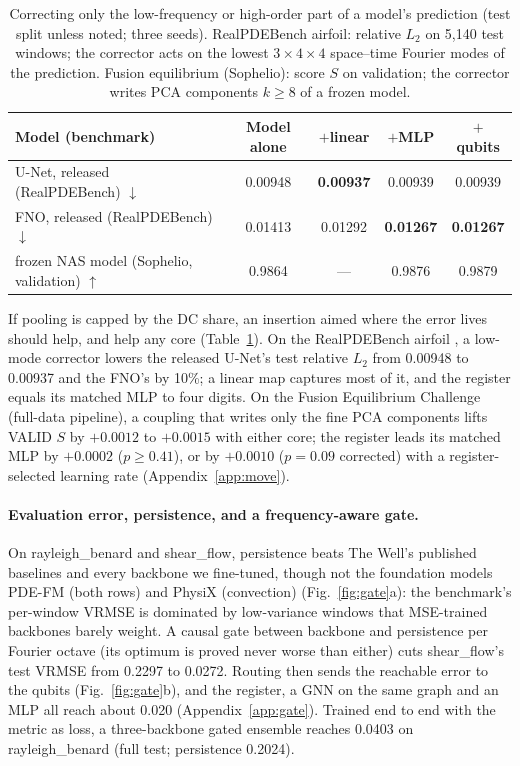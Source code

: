 \documentclass{article}
\begin{document}
\begin{table}[t]
\centering
\caption{Correcting only the low-frequency or high-order part of a model's prediction (test split unless noted;
three seeds). RealPDEBench airfoil: relative $L_2$ on 5{,}140 test windows; the corrector acts on the
lowest $3{\times}4{\times}4$ space--time Fourier modes of the prediction. Fusion equilibrium (Sophelio):
score $S$ on validation; the corrector writes PCA components $k\ge8$ of a frozen model.}
\label{tab:move}
\small
\setlength{\tabcolsep}{4pt}
\begin{tabular}{lcccc}
\toprule
Model (benchmark) & Model alone & $+$linear & $+$MLP & $+$qubits \\
\midrule
U-Net, released (RealPDEBench) $\downarrow$ & 0.00948 & \textbf{0.00937} & 0.00939 & 0.00939 \\
FNO, released (RealPDEBench) $\downarrow$ & 0.01413 & 0.01292 & \textbf{0.01267} & \textbf{0.01267} \\
frozen NAS model (Sophelio, validation) $\uparrow$ & 0.9864 & --- & 0.9876 & 0.9879 \\
\bottomrule
\end{tabular}
\end{table}

If pooling is capped by the DC share, an insertion aimed where the error lives should help, and help any core
(Table~\ref{tab:move}). On the RealPDEBench airfoil \citep{hu2026realpdebench}, a low-mode corrector lowers the
released U-Net's test relative $L_2$ from 0.00948 to 0.00937 and the FNO's by 10\%; a linear map captures most of it,
and the register equals its matched MLP to four digits. On the Fusion Equilibrium Challenge (full-data pipeline), a
coupling that writes only the fine PCA components lifts VALID $S$ by $+0.0012$ to $+0.0015$ with either core; the
register leads its matched MLP by $+0.0002$ ($p \ge 0.41$), or by $+0.0010$ ($p=0.09$ corrected) with a
register-selected learning rate (Appendix~\ref{app:move}).

\paragraph{Evaluation error, persistence, and a frequency-aware gate.} On rayleigh\_benard and shear\_flow, persistence
beats The Well's published baselines and every backbone we fine-tuned, though not the foundation models PDE-FM (both rows) and PhysiX (convection) (Fig.~\ref{fig:gate}a): the benchmark's per-window VRMSE is dominated by
low-variance windows that MSE-trained backbones barely weight. A causal gate between backbone and persistence per Fourier
octave (its optimum is proved never worse than either) cuts shear\_flow's test VRMSE from 0.2297 to 0.0272. Routing then sends the
reachable error to the qubits (Fig.~\ref{fig:gate}b), and the register, a GNN on the same graph and an MLP all reach
about 0.020 (Appendix~\ref{app:gate}). Trained end to end with the metric as loss, a three-backbone gated ensemble reaches 0.0403 on
rayleigh\_benard (full test; persistence 0.2024).
\end{document}

